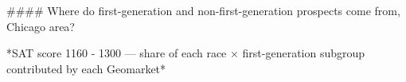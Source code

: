 #### Where do first-generation and non-first-generation prospects come from, Chicago area?

*SAT score 1160 - 1300 — share of each race × first-generation subgroup contributed by each Geomarket*
